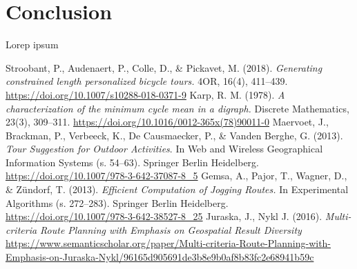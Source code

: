 \documentclass{ctuthesis}
\begin{document}
\chapter{Conclusion}
Lorep ipsum \cite{stroobant}
\begin{thebibliography}{1}
Stroobant, P., Audenaert, P., Colle, D., \& Pickavet, M. (2018). \emph{Generating constrained length personalized bicycle tours.} 4OR, 16(4), 411–439. \url{https://doi.org/10.1007/s10288-018-0371-9} 
Karp, R. M. (1978). \emph{A characterization of the minimum cycle mean in a digraph.} Discrete Mathematics, 23(3), 309–311. \url{https://doi.org/10.1016/0012-365x(78)90011-0} 
Maervoet, J., Brackman, P., Verbeeck, K., De Causmaecker, P., \& Vanden Berghe, G. (2013). \emph{Tour Suggestion for Outdoor Activities}. In Web and Wireless Geographical Information Systems (s. 54–63). Springer Berlin Heidelberg. \url{https://doi.org/10.1007/978-3-642-37087-8_5} 
Gemsa, A., Pajor, T., Wagner, D., \& Zündorf, T. (2013). \emph{Efficient Computation of Jogging Routes.} In Experimental Algorithms (s. 272–283). Springer Berlin Heidelberg. \url{https://doi.org/10.1007/978-3-642-38527-8_25} 
 Juraska, J., Nykl J. (2016). \emph{Multi-criteria Route Planning with Emphasis on Geospatial Result Diversity} \url{https://www.semanticscholar.org/paper/Multi-criteria-Route-Planning-with-Emphasis-on-Juraska-Nykl/96165d905691de3b8e9b0af8b83fc2e68941b59c}
\end{thebibliography}
\end{document}
